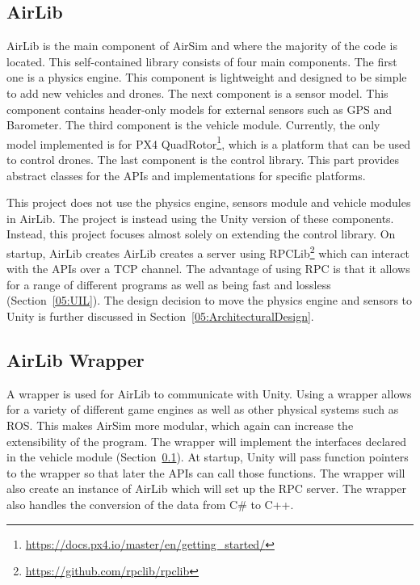 \subsection{AirLib} \label{05:AirLib}
AirLib is the main component of AirSim and where the majority of the code is located. This self-contained library consists of four main components. The first one is a physics engine. This component is lightweight and designed to be simple to add new vehicles and drones. The next component is a sensor model. This component contains header-only models for external sensors such as GPS and Barometer. The third component is the vehicle module. Currently, the only model implemented is for PX4 QuadRotor\footnote{\url{https://docs.px4.io/master/en/getting\_started/}}, which is a platform that can be used to control drones. The last component is the control library. This part provides abstract classes for the APIs and implementations for specific platforms. 

This project does not use the physics engine, sensors module and vehicle modules in AirLib. The project is instead using the Unity version of these components. Instead, this project focuses almost solely on extending the control library. On startup, AirLib creates AirLib creates a server using RPCLib\footnote{\url{https://github.com/rpclib/rpclib}} which can interact with the APIs over a TCP channel. The advantage of using RPC is that it allows for a range of different programs as well as being fast and lossless (Section~\ref{05:UIL}). The design decision to move the physics engine and sensors to Unity is further discussed in Section~\ref{05:ArchitecturalDesign}. 

\subsection{AirLib Wrapper}
A wrapper is used for AirLib to communicate with Unity. Using a wrapper allows for a variety of different game engines as well as other physical systems such as ROS. This makes AirSim more modular, which again can increase the extensibility of the program. The wrapper will implement the interfaces declared in the vehicle module (Section~\ref{05:AirLib}). At startup, Unity will pass function pointers to the wrapper so that later the APIs can call those functions. The wrapper will also create an instance of AirLib which will set up the RPC server. The wrapper also handles the conversion of the data from C\# to C++.

